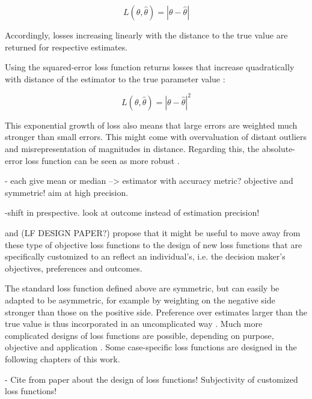         \begin{equation}\label{eq:LossFunction}
        L(\theta,\hat{\theta}) = |\theta - \hat{\theta}|
        \end{equation}        
        
        Accordingly, losses increasing linearly with the distance to the true value are returned for respective estimates.
        
        Using the squared-error loss function returns losses that increase quadratically with distance of the estimator to the true parameter value \cite{davidson2015}:
        
        \begin{equation}\label{eq:LossFunction}
        L(\theta,\hat{\theta}) = |\theta - \hat{\theta}|^2
        \end{equation}        
        
        This exponential growth of loss also means that large errors are weighted much stronger than small errors. This might come with overvaluation of distant outliers and misrepresentation of magnitudes in distance. Regarding this, the absolute-error loss function can be seen as more robust \cite{davidson2015}.
        
        - each give mean or median --> estimator with accuracy metric? objective and symmetric! aim at high precision. 
        
        -shift in prespective. look at outcome instead of estimation precision!     
           
        \cite{davidson2015} and (LF DESIGN PAPER?) propose that it might be useful to move away from these type of objective loss functions to the design of new loss functions that are specifically customized to an reflect an individual's, i.e. the decision maker's objectives, preferences and outcomes. 
        
        The standard loss function defined above are symmetric, but can easily be adapted to be asymmetric, for example by weighting on the negative side stronger than those on the positive side. Preference over estimates larger than the true value is thus incorporated in an uncomplicated way \cite{davidson2015}. Much more complicated designs of loss functions are possible, depending on purpose, objective and application \cite{davidson2015}. Some case-specific loss functions are designed in the following chapters of this work.
        
        - Cite from paper about the design of loss functions! Subjectivity of customized loss functions!
        
